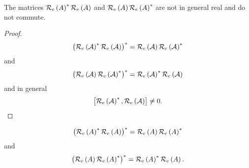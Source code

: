 \begin{lemma}
The matrices ${\cal R}_{e}\left( A\right) ^{\ast }{\cal R}_{e}\left(
A\right) $ and ${\cal R}_{e}\left( A\right) {\cal R}_{e}\left( A\right)
^{\ast }$ are not in general real and do not commute.

\begin{proof}
\begin{equation}
\left( {\cal R}_{e}\left( {\cal A}\right) ^{\ast }{\cal R}_{e}\left( {\cal A}%
\right) \right) ^{\ast }={\cal R}_{e}\left( {\cal A}\right) {\cal R}%
_{e}\left( {\cal A}\right) ^{\ast }
\end{equation}%
and%
\begin{equation}
\left( {\cal R}_{e}\left( {\cal A}\right) {\cal R}_{e}\left( {\cal A}\right)
^{\ast }\right) ^{\ast }={\cal R}_{e}\left( {\cal A}\right) ^{\ast }{\cal R}%
_{e}\left( {\cal A}\right) 
\end{equation}%
and in general 
\begin{equation}
\left[ {\cal R}_{e}\left( {\cal A}\right) ^{\ast },{\cal R}_{e}\left( {\cal A%
}\right) \right] \neq 0.
\end{equation}
\end{proof}%
\begin{equation}
\left( {\cal R}_{e}\left( A\right) ^{\ast }{\cal R}_{e}\left( A\right)
\right) ^{\ast }={\cal R}_{e}\left( A\right) {\cal R}_{e}\left( A\right)
^{\ast }
\end{equation}%
and 
\begin{equation}
\left( {\cal R}_{e}\left( A\right) {\cal R}_{e}\left( A\right) ^{\ast
}\right) ^{\ast }={\cal R}_{e}\left( A\right) ^{\ast }{\cal R}_{e}\left(
A\right) .
\end{equation}
\end{lemma}

